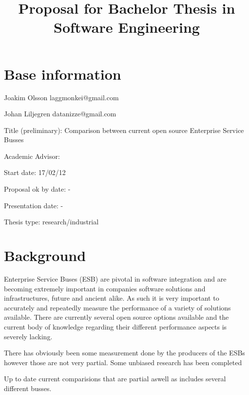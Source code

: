 \documentclass[10pt,a4paper]{proposal}
\title{Proposal for Bachelor Thesis in Software Engineering}
\begin{document}
\maketitle
\thispagestyle{fancy}


\section*{Base information}

Joakim Olsson laggmonkei@gmail.com

Johan Liljegren datanizze@gmail.com

Title (preliminary): Comparison between current open source Enterprise Service Busses

Academic Advisor:  

Start date: 17/02/12

Proposal ok by date: -

Presentation date: -


Thesis type: research\slash industrial


\section*{Background}

Enterprise Service Buses (ESB) \cite{falko07} are pivotal in software integration and are becoming extremely important in companies software solutions and  infrastructures, future and ancient alike. \cite{fenner03}
As such it is very important to accurately and repeatedly measure the performance of a variety of solutions available. 
There are currently several open source options available \cite{mehta11} and the current body of knowledge regarding their different performance aspects is severely lacking.

There has obviously been some measurement done by the producers of the ESBs however those are not very partial. Some unbiased research has been completed \cite{den där thesisen jag hittade som blivit gjord innan 2011}

Up to date current comparisions that are partial aswell as includes several different busses.
\end{document}
